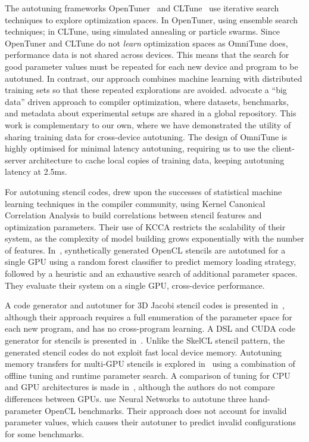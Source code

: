   The autotuning frameworks OpenTuner~\cite{Ansel2013} and CLTune~\cite{Nugteren2015} use iterative search techniques to explore optimization spaces. In OpenTuner, using ensemble search techniques; in CLTune, using simulated annealing or particle swarms. Since OpenTuner and CLTune do not \emph{learn} optimization spaces as OmniTune does, performance data is not shared across devices. This means that the search for good parameter values must be repeated for each new device and program to be autotuned. In contrast, our approach combines machine learning with distributed training sets so that these repeated explorations are avoided. \cite{Fursin2015} advocate a ``big data'' driven approach to compiler optimization, where datasets, benchmarks, and metadata about experimental setups are shared in a global repository. This work is complementary to our own, where we have demonstrated the utility of sharing training data for cross-device autotuning. The design of OmniTune is highly optimised for minimal latency autotuning, requiring us to use the client-server architecture to cache local copies of training data, keeping autotuning latency at 2.5ms.

  For autotuning stencil codes, \cite{Ganapathi2009} drew upon the
  successes of statistical machine learning techniques in the compiler
  community, using Kernel Canonical Correlation Analysis to build
  correlations between stencil features and optimization
  parameters. Their use of KCCA restricts the scalability of their
  system, as the complexity of model building grows exponentially with
  the number of features. In~\cite{Garvey2015b}, synthetically generated
  OpenCL stencils are autotuned for a single GPU using a random forest
  classifier to predict memory loading strategy, followed by a heuristic
  and an exhaustive search of additional parameter spaces. They evaluate
  their system on a single GPU, cross-device performance.

  A code generator and autotuner for 3D Jacobi stencil codes is
  presented in~\cite{Zhang2013a}, although their approach requires a
  full enumeration of the parameter space for each new program, and has
  no cross-program learning. A DSL and CUDA code generator for stencils
  is presented in~\cite{Kamil2010}. Unlike the SkelCL stencil pattern,
  the generated stencil codes do not exploit fast local device
  memory. Autotuning memory transfers for multi-GPU stencils is explored
  in~\cite{Lutz2013} using a combination of offline tuning and runtime
  parameter search. A comparison of tuning for CPU and GPU architectures
  is made in~\cite{Christen2011}, although the authors do not compare
  differences between GPUs. \cite{Falch2015} use Neural Networks to
  autotune three hand-parameter OpenCL benchmarks. Their approach does
  not account for invalid parameter values, which causes their autotuner
  to predict invalid configurations for some benchmarks.

